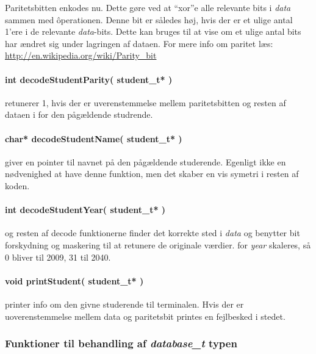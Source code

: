 Paritetsbitten enkodes nu. Dette gøre ved at ``xor''e alle relevante bits i
\emph{data} sammen med \^ operationen. Denne bit er således høj, hvis der er et
ulige antal 1'ere i de relevante \emph{data}-bits. Dette kan bruges til at vise
om et ulige antal bits har ændret sig under lagringen af dataen.
For mere info om paritet læs: \url{http://en.wikipedia.org/wiki/Parity_bit}

\paragraph{int decodeStudentParity( student\_t* )} retunerer 1, hvis der er
uverenstemmelse mellem paritetsbitten og resten af dataen i for den pågældende
studrende.

\paragraph{char* decodeStudentName( student\_t* )} giver en pointer til navnet
på den pågældende studerende. Egenligt ikke en nødvenighed at have denne
funktion, men det skaber en vis symetri i resten af koden.

\paragraph{int decodeStudentYear( student\_t* )} og resten af decode
funktionerne finder det korrekte sted i \emph{data} og benytter bit forskydning og maskering
til at retunere de originale værdier. for \emph{year} skaleres, så 0 bliver til
2009, 31 til 2040.

\paragraph{void printStudent( student\_t* )} printer info om den givne
studerende til terminalen. Hvis der er uoverenstemmelse mellem data og
paritetsbit printes en fejlbesked i stedet.

\subsubsection{Funktioner til behandling af \emph{database\_t} typen}
